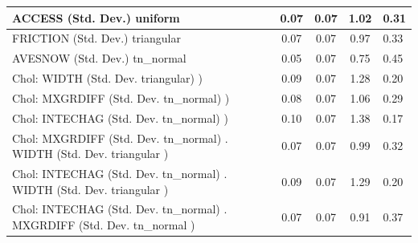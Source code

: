 \begin{table}
\begin{center}
\begin{tabular}{|l|l|c|c|c|l|}
			\hline
			ACCESS (Std. Dev.) uniform &  & 0.07 & 0.07 & 1.02 & 0.31 \\
			\hline
			FRICTION (Std. Dev.) triangular &  & 0.07 & 0.07 & 0.97 & 0.33 \\
			\hline
			AVESNOW (Std. Dev.) tn_normal &  & 0.05 & 0.07 & 0.75 & 0.45 \\
			\hline
			 Chol: WIDTH (Std. Dev. triangular) ) &  & 0.09 & 0.07 & 1.28 & 0.20 \\
			\hline
			 Chol: MXGRDIFF (Std. Dev. tn_normal) ) &  & 0.08 & 0.07 & 1.06 & 0.29 \\
			\hline
			 Chol: INTECHAG (Std. Dev. tn_normal) ) &  & 0.10 & 0.07 & 1.38 & 0.17 \\
			\hline
			 Chol: MXGRDIFF (Std. Dev. tn_normal) . WIDTH (Std. Dev.   triangular ) &  & 0.07 & 0.07 & 0.99 & 0.32 \\
			\hline
			 Chol: INTECHAG (Std. Dev. tn_normal) . WIDTH (Std. Dev.   triangular ) &  & 0.09 & 0.07 & 1.29 & 0.20 \\
			\hline
			 Chol: INTECHAG (Std. Dev. tn_normal) . MXGRDIFF (Std. Dev.   tn_normal ) &  & 0.07 & 0.07 & 0.91 & 0.37 \\
			\hline
		\end{tabular}
	\end{center}
\end{table}